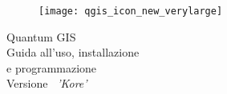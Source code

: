 
\begin{titlepage}
\begin{center}

\begin{figure}[H]
\begin{center}
\texttt{[image: qgis\_icon\_new\_verylarge]} 
\end{center}
\end{figure}

\Huge{Quantum GIS}\\
\vspace{0.5cm}
\Large{Guida all'uso, installazione \\e programmazione} \\
\vspace{0.5cm}
\Large{Versione ~\CURRENT \textsl{'Kore'}}

\end{center}
\end{titlepage}
